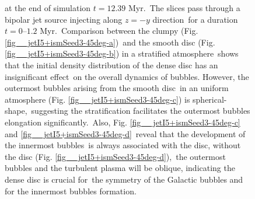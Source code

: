 \documentclass[fleqn,usenatbib,useAMS]{mnras}
\begin{document}
\begin{figure}
{             at the end of simulation $t=12.39$ Myr.\
             The slices pass through a bipolar jet source injecting along $z=-y$ direction\
             for a duration $t=0$--$1.2$ Myr.\
             Comparison between the clumpy (Fig. \ref{fig__jetI5+ismSeed3-45deg-a})\
             and the smooth disc (Fig. \ref{fig__jetI5+ismSeed3-45deg-b}) in a stratified atmosphere\
             shows that the initial density distribution of the dense disc has an insignificant effect\
             on the overall dynamics of bubbles. However, the outermost bubbles arising from the smooth disc\
             in an uniform atmosphere (Fig. \ref{fig__jetI5+ismSeed3-45deg-c}) is spherical-shape,\
             suggesting the stratification facilitates the outermost bubbles elongation significantly.\
             Also, Fig. \ref{fig__jetI5+ismSeed3-45deg-c} and \ref{fig__jetI5+ismSeed3-45deg-d}\
             reveal that the development of the innermost bubbles\
             is always associated with the disc, without the disc (Fig. \ref{fig__jetI5+ismSeed3-45deg-d}),\
             the outermost bubbles and the turbulent plasma will be oblique,
             indicating the dense disc is crucial for\
             the symmetry of the Galactic bubbles and for the innermost bubbles formation.
      }
      \label{fig__jetI5+ismSeed3-45deg}
 \end{figure}%
\end{document}

